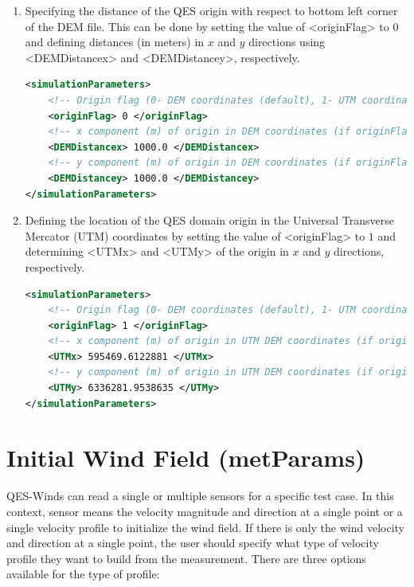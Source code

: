 \begin{enumerate}
\item Specifying the distance of the QES origin with respect to bottom left corner of the DEM file. This can be done by setting the value of <originFlag> to $0$ and defining distances (in meters) in $x$ and $y$ directions using <DEMDistancex> and <DEMDistancey>, respectively.

\begin{lstlisting}[language=XML]
<simulationParameters>
	<!-- Origin flag (0- DEM coordinates (default), 1- UTM coordinates) -->
	<originFlag> 0 </originFlag>		
	<!-- x component (m) of origin in DEM coordinates (if originFlag = 0) -->		
	<DEMDistancex> 1000.0 </DEMDistancex> 		
	<!-- y component (m) of origin in DEM coordinates (if originFlag = 0) -->	
	<DEMDistancey> 1000.0 </DEMDistancey> 				
</simulationParameters>
\end{lstlisting}

\item Defining the location of the QES domain origin in the Universal Transverse Mercator (UTM) coordinates by setting the value of <originFlag> to $1$ and determining <UTMx> and <UTMy> of the origin in $x$ and $y$ directions, respectively.

\begin{lstlisting}[language=XML]
<simulationParameters>
	<!-- Origin flag (0- DEM coordinates (default), 1- UTM coordinates) -->
	<originFlag> 1 </originFlag>	
	<!-- x component (m) of origin in UTM DEM coordinates (if originFlag = 1)-->				
	<UTMx> 595469.6122881 </UTMx>
	<!-- y component (m) of origin in UTM DEM coordinates (if originFlag = 1)--> 			
	<UTMy> 6336281.9538635 </UTMy> 					
</simulationParameters>
\end{lstlisting}

\end{enumerate}


\section{Initial Wind Field (metParams)}

QES-Winds can read a single or multiple sensors for a specific test case. In this context, sensor means the velocity magnitude and direction at a single point or a single velocity profile to initialize the wind field. If there is only the wind velocity and direction at a single point, the user should specify what type of velocity profile they want to build from the measurement. There are three options available for the type of profile:

